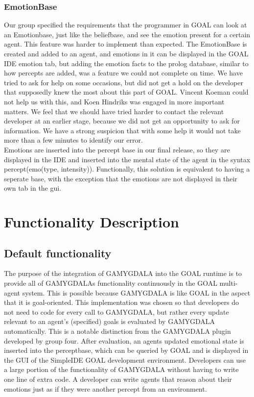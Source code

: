 \documentclass[11pt]{article}
\begin{document}
\subsubsection*{EmotionBase}
Our group specified the requirements that the programmer in GOAL can look at an Emotionbase, just like the beliefbase, and see the emotion present for a certain agent. This feature was harder to implement than expected. The EmotionBase is created and added to an agent, and emotions in it can be displayed in the GOAL IDE emotion tab, but adding the emotion facts to the prolog database, similar to how percepts are added, was a feature we could not complete on time. We have tried to ask for help on some occasions, but did not get a hold on the developer that supposedly knew the most about this part of GOAL. Vincent Koeman could not help us with this, and Koen Hindriks was engaged in more important matters. We feel that we should have tried harder to contact the relevant developer at an earlier stage, because we did not get an opportunity to ask for information. We have a strong suspicion that with some help it would not take more than a few minutes to identify our error.\\
Emotions are inserted into the percept base in our final release, so they are displayed in the IDE and inserted into the mental state of the agent in the syntax percept(emo(type, intensity)). Functionally, this solution is equivalent to having a seperate base, with the exception that the emotions are not displayed in their own tab in the gui. 


\section{Functionality Description}
\subsection{Default functionality}
The purpose of the integration of GAMYGDALA\cite{GAMYGDALA} into the GOAL runtime is to provide all of GAMYGDALAs functionality continuously in the GOAL multi-agent system. This is possible because GAMYGDALA is like GOAL in the aspect that it is goal-oriented. This implementation was chosen so that developers do not need to code for every call to GAMYGDALA, but rather every update relevant to an agent's (specified) goals is evaluated by GAMYGDALA automatically. This is a notable distinction from the GAMYGDALA plugin developed by group four. After evaluation, an agents updated emotional state is inserted into the perceptbase, which can be queried by GOAL and is displayed in the GUI of the SimpleIDE GOAL development environment. Developers can use a large portion of the functionality of GAMYGDALA without having to write one line of extra code. A developer can write agents that reason about their emotions just as if they were another percept from an environment.
\end{document}
